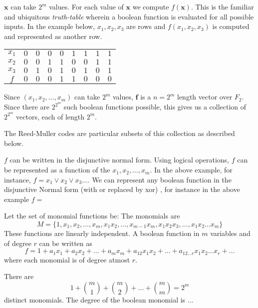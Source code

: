 \documentclass{article}
\newcommand{\V}[1]{\ensuremath{\mathbf{#1}}}
\theoremstyle{plain}
\begin{document}
$\V{x}$ can take $2^m$ values. For each value of $\V{x}$ we compute $f(\V{x})$. This is the familiar and ubiquitous \emph{truth-table} wherein a boolean function is evaluated for all possible inputs.
In the example below, $x_1, x_2, x_3$ are rows and $f(x_1, x_2, x_3)$ is computed and represented as another row. 
\begin {center}
\begin{tabular}{|c|c|c|c|c|c|c|c|c|}
$x_1$ & $0$ & $0$ & $0$ & $0$ & $1$ & $1$ & $1$ & $1$ \\
$x_2$ & $0$ & $0$ & $1$ & $1$ & $0$ & $0$ & $1$ & $1$ \\
$x_3$ & $0$ & $1$ & $0$ & $1$ & $0$ & $1$ & $0$ & $1$ \\
$f$   & $0$ & $0$ & $0$ & $1$ & $1$ & $0$ & $0$ & $0$ \\

\end{tabular}
\end{center} 

Since $(x_1,x_2,\ldots,x_m)$ can take $2^m$ values, $\V{f}$ is a $n=2^m$ length vector over $F_2$. Since there are $2^2^m$ such boolean functions possible, this gives us a collection of  $2^2^m$ vectors, each of length $2^m$.
 
The Reed-Muller codes are particular subsets of this collection as described below.

$f$ can be written in the disjunctive normal form.
Using logical operations, $f$ can be represented as a function of the $x_1, x_2,\ldots , x_m$. In the above example, for instance, $f = x_1 \vee x_2 \vee x_3 ... $. We can represent any boolean function in the disjunctive Normal form (with or replaced by xor) \cite{Problem2}, for instance in the above example $f = $

Let the set of monomial functions be:
The monomials are \begin{equation*}
M = \{1,x_1,x_2,\ldots,x_m,x_1x_2,\ldots,x_{m-1}x_m,x_1x_2x_3,\ldots,x_1x_2\ldots x_m\}
\end{equation*}
These functions are linearly independent. A boolean function in $m$ variables and of degree $r$ can be written as
\begin{equation*}
  f = 1 + a_1x_1+a_2x_2+\ldots+a_mx_m + a_{12}x_1x_2+\ldots+a_{12\ldots r}x_1x_2\ldots x_r+\ldots
\end{equation*}
where each monomial is of degree atmost $r$.

There are
\begin{equation*}
  1+\binom{m}{1}+\binom{m}{2}+\ldots+\binom{m}{m} = 2^m 
\end{equation*}
distinct monomials. 
The degree of the boolean monomial is ...
\end{document}
